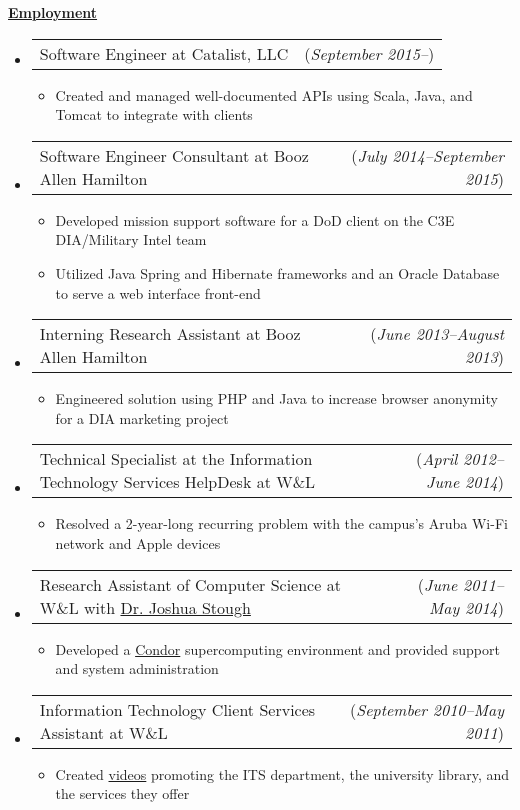 \documentclass[11pt, letterpaper]{letter}
\makeatletter
\newlength{\indwidth}				\setlength{\indwidth}{\textwidth-.4in}
\newlength{\listSpacing}			\setlength{\listSpacing}{.0375in}
\newlength{\headerAntispace}		\setlength{\headerAntispace}{-6pt}
\newlength{\subListAntispace}		\setlength{\subListAntispace}{-.25in}
\newlength{\subListMidAntispace}	\setlength{\subListMidAntispace}{-2.5pt}
\newlength{\subListEndAntispace}	\setlength{\subListEndAntispace}{-.075in}
\newcommand{\lst}[1]{\vspace{\subListAntispace}\begin{itemize} \item #1 \end{itemize}\vspace{\subListEndAntispace}}
\newcommand{\dated}[2]{
	\begin{tabular*}{\indwidth}{l@{\extracolsep{\fill}}r}#1 & (\textit{#2})\end{tabular*}}
\newcommand{\datedTwo}[3]{
	\begin{tabular*}{\indwidth}{l@{\extracolsep{\fill}}r}#1 & (\textit{#2}) (\textit{#3})\end{tabular*}}
\newcommand \myul[3]{%
	\begingroup%
	\renewcommand \ULdepth {#1}%
	\renewcommand \ULthickness {#2}%
	\uline{#3}%
	\endgroup%
}
\newcommand \sectionheader[1]{
	\myul{2.7pt}{0.5pt}{\large \textbf{#1}}
}
\makeatother
\begin{document}
\sectionheader{Employment}
\vspace{\headerAntispace}
\begin{itemize}
	\setlength{\itemsep}{\listSpacing}
	\item \dated{Software Engineer at Catalist, LLC}{September 2015--}
	\lst{
		Created and managed well-documented APIs using Scala, Java, and Tomcat to integrate with clients
	}
	\item \dated{Software Engineer Consultant at Booz Allen Hamilton}{July 2014--September 2015}
	\lst{
		Developed mission support software for a DoD client on the C3E DIA/Military Intel team
		\vspace{\subListMidAntispace}
		\item Utilized Java Spring and Hibernate frameworks and an Oracle Database to serve a web
		      interface front-end
		\vspace{\subListMidAntispace}
	}
	\item \dated{Interning Research Assistant at Booz Allen Hamilton}{June 2013--August 2013}
		\lst{Engineered solution using PHP and Java to increase browser anonymity for a DIA
		     marketing project}
	\item \dated{Technical Specialist at the Information Technology Services HelpDesk at W\&L}
	            {April 2012--June 2014}
		\lst{Resolved a 2-year-long recurring problem with the campus's Aruba Wi-Fi network and Apple devices}
	\item \dated{Research Assistant of Computer Science at W\&L with 
	             \href{http://cs.wlu.edu/~stough/}{Dr. Joshua Stough}}
	            {June 2011--May 2014}
		\lst{Developed a \href{http://www.htcondorproject.org/}{Condor} supercomputing environment and provided support and system administration
		}
	\item \dated{Information Technology Client Services Assistant at W\&L}{September 2010--May 2011}
		\lst{Created \href{http://youtu.be/NvOarFOmly0?hd=1}{videos} promoting the ITS department,
		     the university library, and the services they offer
		}
	\iftoggle{smithbros}{
		\item \datedTwo{File Digitizer at Smith Brothers Abstract and Title Co.}
				{June 2009--August 2009}{June 2010--August 2010}
	}{}
\end{itemize}
\end{document}
